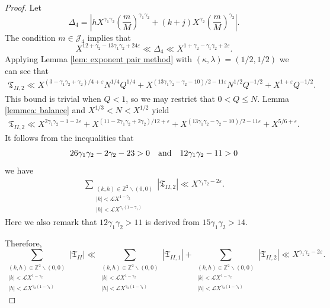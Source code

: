 \documentclass[12pt, reqno, twoside, letterpaper]{amsart}
\numberwithin{equation}{section}
\newcommand{\cL}{\ensuremath{\mathcal{L}}}
\newcommand{\ZZ}{\ensuremath{\mathbb{Z}}}
\theoremstyle{customthm}
\theoremstyle{customrem}
\begin{document}
\begin{proof}
	Let
	$$
	\Delta_4=\left|hX^{\gamma_1\gamma_2}
	\left(\frac{m}{M}\right)^{\gamma_1\gamma_2}
	+(k+j)X^{\gamma_2}\left(\frac{m}{M}\right)^{\gamma_2}\right|.
	$$
	The condition $m\in\mathcal{J}_4$ implies that
	$$
   X^{12+\gamma_2-13\gamma_1\gamma_2+24\varepsilon}\ll \Delta_4\ll
   X^{1+\gamma_2-\gamma_1\gamma_2+2\varepsilon}.
   $$
	Applying Lemma \ref{lem: exponent pair method} with $(\kappa,\lambda)=(1/2,1/2)$
	we can see that
	\begin{align*}
		\mathfrak{T}_{II,2}\ll X^{(3-\gamma_1\gamma_2+\gamma_2)/4+\varepsilon}N^{1/4}Q^{1/4}
		+X^{(13\gamma_1\gamma_2-\gamma_2-10)/2-11\varepsilon}N^{1/2}Q^{-1/2}
		+X^{1+\varepsilon}Q^{-1/2}.
	\end{align*}
	This bound is trivial when $Q<1$, so we may restrict that $0<Q\leqslant N$.
	Lemma \ref{lemmea: balance} and $X^{1/3}<N<X^{1/2}$ yield
    \begin{align*}
    \mathfrak{T}_{II,2}\ll
		X^{2\gamma_1\gamma_2-1-3\varepsilon}
       +X^{(11-2\gamma_1\gamma_2+2\gamma_2)/12+\varepsilon}
       +X^{(13\gamma_1\gamma_2-\gamma_2-10)/2-11\varepsilon}
       +X^{5/6+\varepsilon}.
    \end{align*}
    It follows from the inequalities that
    $$
    26\gamma_1\gamma_2-2\gamma_2-23>0\ \ \ \hbox{and}
    \ \ \ 12\gamma_1\gamma_2-11>0
    $$
    we have
	\begin{align*}
		\sum_{\substack{(k,h) \in \ZZ^2 \backslash (0,0) \\ |k|<\cL X^{1-\gamma_2} \\ |h|<\cL X^{\gamma_2(1-\gamma_1)}}}|\mathfrak{T}_{II,2}|
     \ll X^{\gamma_1\gamma_2-2\varepsilon}.
	\end{align*}
Here we also remark that $12\gamma_1\gamma_2>11$ is derived from $15\gamma_1\gamma_2>14$.

   Therefore,
   $$
   \sum_{\substack{(k,h) \in \ZZ^2 \backslash (0,0) \\ |k|<\cL X^{1-\gamma_2} \\ |h|<\cL X^{\gamma_2(1-\gamma_1)}}}|\mathfrak{T}_{II}|
   \ll \sum_{\substack{(k,h) \in \ZZ^2 \backslash (0,0) \\ |k|<\cL X^{1-\gamma_2} \\ |h|<\cL X^{\gamma_2(1-\gamma_1)}}}|\mathfrak{T}_{II,1}|
   +\sum_{\substack{(k,h) \in \ZZ^2 \backslash (0,0) \\ |k|<\cL X^{1-\gamma_2} \\ |h|<\cL X^{\gamma_2(1-\gamma_1)}}}|\mathfrak{T}_{II,2}|
     \ll X^{\gamma_1\gamma_2-2\varepsilon}.
   $$
\end{proof}
\end{document}
